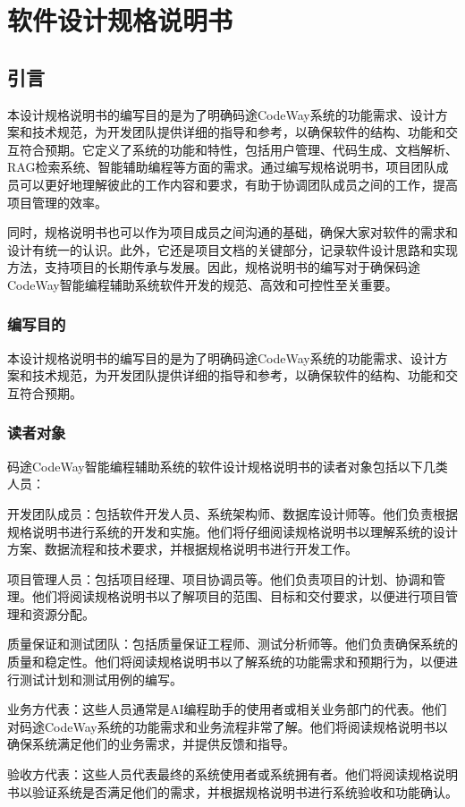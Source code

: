 \documentclass[
    report,     %
    oneside,    %
    UTF8,       %
    zihao=-4    %
]{config} %
\begin{document}
\chapter{软件设计规格说明书}
\section{引言}
本设计规格说明书的编写目的是为了明确码途CodeWay系统的功能需求、设计方案和技术规范，为开发团队提供详细的指导和参考，以确保软件的结构、功能和交互符合预期。它定义了系统的功能和特性，包括用户管理、代码生成、文档解析、RAG检索系统、智能辅助编程等方面的需求。通过编写规格说明书，项目团队成员可以更好地理解彼此的工作内容和要求，有助于协调团队成员之间的工作，提高项目管理的效率。

同时，规格说明书也可以作为项目成员之间沟通的基础，确保大家对软件的需求和设计有统一的认识。此外，它还是项目文档的关键部分，记录软件设计思路和实现方法，支持项目的长期传承与发展。因此，规格说明书的编写对于确保码途CodeWay智能编程辅助系统软件开发的规范、高效和可控性至关重要。
\subsection{编写目的}
本设计规格说明书的编写目的是为了明确码途CodeWay系统的功能需求、设计方案和技术规范，为开发团队提供详细的指导和参考，以确保软件的结构、功能和交互符合预期。
\subsection{读者对象}
码途CodeWay智能编程辅助系统的软件设计规格说明书的读者对象包括以下几类人员：

开发团队成员：包括软件开发人员、系统架构师、数据库设计师等。他们负责根据规格说明书进行系统的开发和实施。他们将仔细阅读规格说明书以理解系统的设计方案、数据流程和技术要求，并根据规格说明书进行开发工作。

项目管理人员：包括项目经理、项目协调员等。他们负责项目的计划、协调和管理。他们将阅读规格说明书以了解项目的范围、目标和交付要求，以便进行项目管理和资源分配。

质量保证和测试团队：包括质量保证工程师、测试分析师等。他们负责确保系统的质量和稳定性。他们将阅读规格说明书以了解系统的功能需求和预期行为，以便进行测试计划和测试用例的编写。

业务方代表：这些人员通常是AI编程助手的使用者或相关业务部门的代表。他们对码途CodeWay系统的功能需求和业务流程非常了解。他们将阅读规格说明书以确保系统满足他们的业务需求，并提供反馈和指导。

验收方代表：这些人员代表最终的系统使用者或系统拥有者。他们将阅读规格说明书以验证系统是否满足他们的需求，并根据规格说明书进行系统验收和功能确认。
\end{document}
